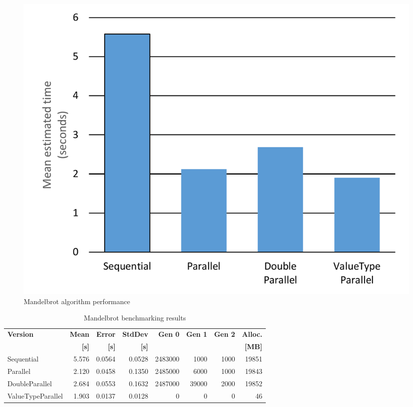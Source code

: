 \begin{figure}[htb]
\centering
\includegraphics[width=.8\linewidth]{figures04/Mandelbrot.pdf}
\caption{Mandelbrot algorithm performance}
\label{fig: MandelbrotPerformance}
\end{figure}

\begin{table}[ht]%
    \centering
    \caption{Mandelbrot benchmarking results}
		\label{tab: MandelbrotBenchmarking}
    \begin{tabularx}{\linewidth}{Xrrrrrrr}
		  \toprule
			\toprule
			\bfseries Version 		&
			\bfseries Mean 	      &
			\bfseries Error       &
			\bfseries StdDev 	    &
			\bfseries Gen 0	    	&
			\bfseries Gen 1	    	&
			\bfseries Gen 2	    	&
			\bfseries Alloc.      \\ 
			&
			\bfseries {[}s{]} &
			\bfseries {[}s{]} &
			\bfseries {[}s{]} &
			&
			&
			&
			\bfseries{[}MB{]} \\			
			\midrule 
			Sequential & 5.576 & 0.0564 & 0.0528 & 2483000 & 1000 & 1000 & 19851  \\ 
			Parallel & 2.120 & 0.0458 & 0.1350 & 2485000 & 6000 & 1000 & 19843 \\ 
			DoubleParallel & 2.684 & 0.0553 & 0.1632 & 2487000 & 39000 & 2000 & 19852  \\ 
			ValueTypeParallel & 1.903 & 0.0137 & 0.0128 & 0 & 0 & 0 & 46  \\ 
			\bottomrule
	\end{tabularx}
\end{table}

\clearpage
\label{sec: NuGet}
